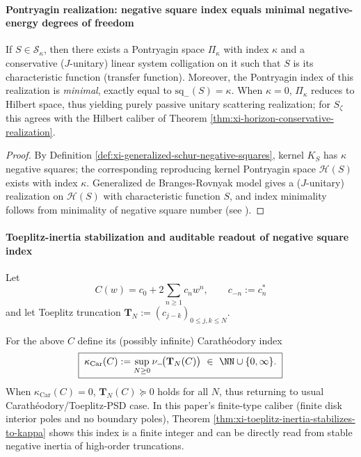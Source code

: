 \paragraph{Pontryagin realization: negative square index equals minimal negative-energy degrees of freedom}
\begin{theorem}\label{thm:xi-minimal-pontryagin-conservative-realization}
If \(S\in\mathcal{S}_{\kappa}\), then there exists a Pontryagin space \(\Pi_{\kappa}\) with index \(\kappa\) and a conservative (\(J\)-unitary) linear system colligation on it such that \(S\) is its characteristic function (transfer function).
Moreover, the Pontryagin index of this realization is \emph{minimal}, exactly equal to \(\mathrm{sq}_-(S)=\kappa\).
When \(\kappa=0\), \(\Pi_{\kappa}\) reduces to Hilbert space, thus yielding purely passive unitary scattering realization; for \(S_{\zeta}\) this agrees with the Hilbert caliber of Theorem \ref{thm:xi-horizon-conservative-realization}.
\end{theorem}

\begin{proof}
By Definition \ref{def:xi-generalized-schur-negative-squares}, kernel \(K_S\) has \(\kappa\) negative squares; the corresponding reproducing kernel Pontryagin space \(\mathcal{H}(S)\) exists with index \(\kappa\).
Generalized de Branges-Rovnyak model gives a (\(J\)-unitary) realization on \(\mathcal{H}(S)\) with characteristic function \(S\), and index minimality follows from minimality of negative square number (see \cite{AlpayDijksmaRovnyakDeSnoo1997SchurPontryagin}).
\end{proof}

\paragraph{Toeplitz-inertia stabilization and auditable readout of negative square index}
Let
\begin{equation}\label{eq:xi-generalized-carath-series}
\boxed{\;
C(w)=c_0+2\sum_{n\ge 1}c_n w^n,\qquad c_{-n}:=c_n^\ast\;}
\end{equation}
and let Toeplitz truncation
\(
\mathbf{T}_N:=(c_{j-k})_{0\le j,k\le N}
\).

\begin{definition}\label{def:xi-generalized-carath-index-toeplitz}
For the above \(C\) define its (possibly infinite) Carathéodory index
\begin{equation}\label{eq:xi-carath-index-toeplitz}
\boxed{\;
\kappa_{\mathrm{Car}}(C):=\sup_{N\ge 0}\nu_-\!\bigl(\mathbf{T}_N(C)\bigr)\ \in\ \NN\cup\{0,\infty\}.\;}
\end{equation}
When \(\kappa_{\mathrm{Car}}(C)=0\), \(\mathbf{T}_N(C)\succeq 0\) holds for all \(N\), thus returning to usual Carathéodory/Toeplitz-PSD case.
In this paper's finite-type caliber (finite disk interior poles and no boundary poles), Theorem \ref{thm:xi-toeplitz-inertia-stabilizes-to-kappa} shows this index is a finite integer and can be directly read from stable negative inertia of high-order truncations.
\end{definition}

